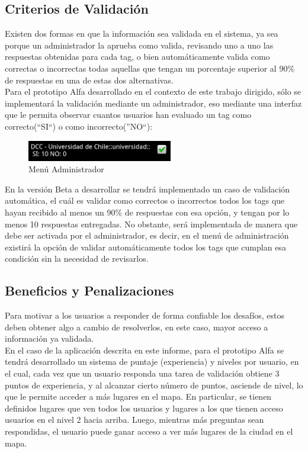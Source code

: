\documentclass[10pt,letterpaper]{article}
\begin{document}
\subsection{Criterios de Validación}

Existen dos formas en que la información sea validada en el sistema, ya sea porque un administrador la aprueba como valida, revisando uno a uno las respuestas obtenidas para cada tag, o bien automáticamente valida como correctas o incorrectas todas aquellas que tengan un porcentaje superior al 90\% de respuestas en una de estas dos alternativas.\\

Para el prototipo Alfa desarrollado en el contexto de este trabajo dirigido, sólo se implementará la validación mediante un administrador, eso mediante una interfaz que le permita observar cuantos usuarios han evaluado un tag como correcto(``SI``) o como incorrecto(''NO``):
\begin{figure}[h]
\begin{center}
\includegraphics[width=180pt]{./imgs/TripdroidAdmin.png}
\caption{Menú Administrador}
\end{center}
\end{figure}

\newpage
En la versión Beta a desarrollar se tendrá implementado un caso de validación automática, el cuál es validar como correctos o incorrectos todos los tags que hayan recibido al menos un 90\% de respuestas con esa opción, y tengan por lo menos 10 respuestas entregadas. No obstante, será implementada de manera que debe ser activada por el administrador, es decir, en el menú de administración  existirá la opción de validar automáticamente todos los tags que cumplan esa condición sin la necesidad de revisarlos.\\

\subsection{Beneficios y Penalizaciones}

Para motivar a los usuarios a responder de forma confiable los desafíos, estos deben obtener algo a cambio de resolverlos, en este caso, mayor acceso a información ya validada.\\

En el caso de la aplicación descrita en este informe, para el prototipo Alfa se tendrá desarrollado un sistema de puntaje (experiencia) y niveles por usuario, en el cual, cada vez que un usuario responda una tarea de validación obtiene 3 puntos de experiencia, y al alcanzar cierto número de puntos, asciende de nivel, lo que le permite acceder a más lugares en el mapa. En particular, se tienen definidos lugares que ven todos los usuarios y lugares a los que tienen acceso usuarios en el nivel 2 hacia arriba. Luego, mientras más preguntas sean respondidas, el usuario puede ganar acceso a ver más lugares de la ciudad en el mapa.\\
\end{document}
